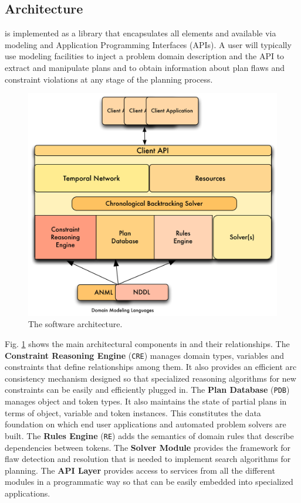 \subsection{Architecture}
\label{sec:europa:arch}

\eu is implemented as a library that encapsulates all elements
 and available via modeling and
Application Programming Interfaces (APIs).  A user will typically use
modeling facilities to inject a problem domain description and the API
to extract and manipulate plans and to obtain information about plan
flaws and constraint violations at any stage of the planning process.

\begin{figure}[b]
\centering
\includegraphics[scale=2.5]{figs/EUROPA-Architecture.jpeg}
\caption{\small The \eu software architecture.}
\label{fig:europa-architecture}
\end{figure}

Fig. \ref{fig:europa-architecture} shows the main architectural
components in \eu and their relationships. The \textbf{Constraint
  Reasoning Engine} (\texttt{CRE}) manages domain types, variables and
constraints that define relationships among them. It also provides an
efficient arc consistency mechanism \cite{mackworth77} designed so
that specialized reasoning algorithms for new constraints can be
easily and efficiently plugged in. The \textbf{Plan Database}
(\texttt{PDB}) manages object and token types. It also maintains the
state of partial plans in terms of object, variable and token
instances. This constitutes the data foundation on which end user
applications and automated problem solvers are built. The
\textbf{Rules Engine} (\texttt{RE}) adds the semantics of domain rules
that describe dependencies between tokens. The \textbf{Solver Module}
provides the framework for flaw detection and resolution that is
needed to implement search algorithms for planning. The \textbf{API
  Layer} provides access to services from all the different modules in
a programmatic way so that \eu can be easily embedded into specialized
applications.

